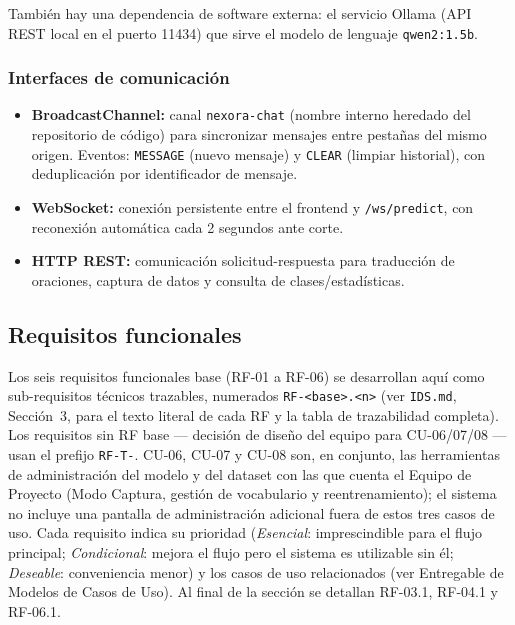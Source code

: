 También hay una dependencia de software externa: el servicio Ollama
(API REST local en el puerto 11434) que sirve el modelo de lenguaje
\texttt{qwen2:1.5b}.

\subsubsection{Interfaces de comunicación}

\begin{itemize}
    \item \textbf{BroadcastChannel:} canal \texttt{nexora-chat} (nombre interno heredado del repositorio de código) para sincronizar mensajes entre pestañas del mismo origen. Eventos: \texttt{MESSAGE} (nuevo mensaje) y \texttt{CLEAR} (limpiar historial), con deduplicación por identificador de mensaje.
    \item \textbf{WebSocket:} conexión persistente entre el frontend y \texttt{/ws/predict}, con reconexión automática cada 2 segundos ante corte.
    \item \textbf{HTTP REST:} comunicación solicitud-respuesta para traducción de oraciones, captura de datos y consulta de clases/estadísticas.
\end{itemize}

\subsection{Requisitos funcionales}

Los seis requisitos funcionales base (RF-01 a RF-06) se desarrollan aquí
como sub-requisitos técnicos trazables, numerados \texttt{RF-<base>.<n>}
(ver \texttt{IDS.md}, Sección~3, para el texto literal de cada RF y la
tabla de trazabilidad completa). Los requisitos sin RF base --- decisión
de diseño del equipo para CU-06/07/08 --- usan el prefijo \texttt{RF-T-}.
CU-06, CU-07 y CU-08 son, en conjunto, las herramientas de administración
del modelo y del dataset con las que cuenta el Equipo de Proyecto (Modo
Captura, gestión de vocabulario y reentrenamiento); el sistema no incluye
una pantalla de administración adicional fuera de estos tres casos de uso.
Cada requisito indica su prioridad (\textit{Esencial}: imprescindible para
el flujo principal; \textit{Condicional}: mejora el flujo pero el sistema
es utilizable sin él; \textit{Deseable}: conveniencia menor) y los casos
de uso relacionados (ver Entregable de Modelos de Casos de Uso). Al final
de la sección se detallan RF-03.1, RF-04.1 y RF-06.1.

